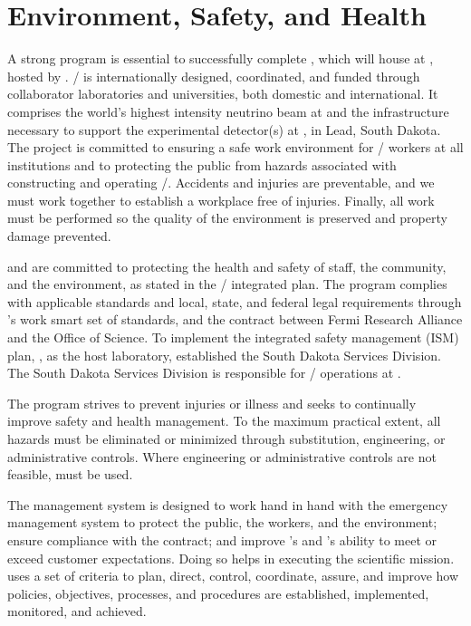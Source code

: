 \chapter{Environment, Safety, and Health}
\label{vl:tc-ESH}


A strong  program is essential to successfully complete
, which will house  at \surf, hosted by
\fnal.  / is internationally designed,
coordinated, and funded through collaborator laboratories and
universities, both domestic and international.  It comprises the
world's highest intensity neutrino beam at \fnal and the
infrastructure necessary to support the experimental detector(s) at
\surf, in Lead, South Dakota.  The project is committed to ensuring a
safe work environment for / workers at all
institutions and to protecting the public from hazards associated with
constructing and operating /.  Accidents and
injuries are preventable, and we must work together to
establish a workplace free of injuries.  Finally, all work must be
performed so the quality of the environment is preserved
and property damage prevented.

\fnal and  are committed to protecting the health and
safety of staff, the community, and the environment, as stated in the
/ integrated  plan.  The
 program complies with applicable standards and local,
state, and federal legal requirements through \fnal's work smart set
of standards, and the contract between Fermi Research Alliance and the
 Office of Science.  To implement the integrated safety
management (ISM) plan, \fnal, as the host laboratory, established the South
Dakota Services Division.  The South Dakota Services Division is
responsible for / operations at \surf.

The program strives to prevent injuries or illness and seeks to
continually improve safety and health management.  To the maximum
practical extent, all hazards must be eliminated or minimized through
substitution, engineering, or administrative controls.  Where
engineering or administrative controls are not feasible, 
must be used.

The  management system is designed to work hand in hand
with the emergency management system to protect the public, the
workers, and the environment; ensure compliance with the contract; and
improve \fnal's and 's ability to meet or exceed customer
expectations. Doing so helps in executing the scientific mission.
\fnal uses a set of criteria to plan, direct, control, coordinate,
assure, and improve how  policies, objectives, processes,
and procedures are established, implemented, monitored, and achieved.

